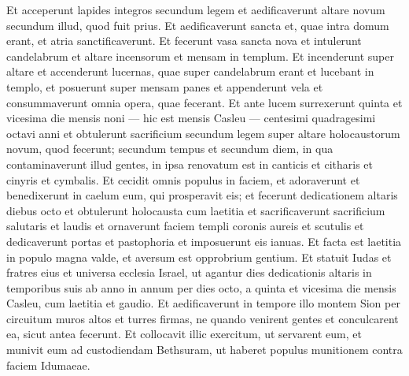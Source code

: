 \begin{biblechapter}
\verse Et acceperunt lapides integros secundum legem et aedificaverunt altare novum secundum illud, quod fuit prius. 
\verse Et aedificaverunt sancta et, quae intra domum erant, et atria sanctificaverunt.  
\verse Et fecerunt vasa sancta nova et intulerunt candelabrum et altare incensorum et mensam in templum. 
\verse Et incenderunt super altare et accenderunt lucernas, quae super candelabrum erant et lucebant in templo, 
\verse et posuerunt super mensam panes et appenderunt vela et consummaverunt omnia opera, quae fecerant. 
\verse Et ante lucem surrexerunt quinta et vicesima die mensis noni — hic est mensis Casleu — centesimi quadragesimi octavi anni 
\verse et obtulerunt sacrificium secundum legem super altare holocaustorum novum, quod fecerunt; 
\verse secundum tempus et secundum diem, in qua contaminaverunt illud gentes, in ipsa renovatum est in canticis et citharis et cinyris et cymbalis.  
\verse Et cecidit omnis populus in faciem, et adoraverunt et benedixerunt in caelum eum, qui prosperavit eis; 
\verse et fecerunt dedicationem altaris diebus octo et obtulerunt holocausta cum laetitia et sacrificaverunt sacrificium salutaris et laudis 
\verse et ornaverunt faciem templi coronis aureis et scutulis et dedicaverunt portas et pastophoria et imposuerunt eis ianuas. 
\verse Et facta est laetitia in populo magna valde, et aversum est opprobrium gentium. 
\verse Et statuit Iudas et fratres eius et universa ecclesia Israel, ut agantur dies dedicationis altaris in temporibus suis ab anno in annum per dies octo, a quinta et vicesima die mensis Casleu, cum laetitia et gaudio. 
\verse Et aedificaverunt in tempore illo montem Sion per circuitum muros altos et turres firmas, ne quando venirent gentes et conculcarent ea, sicut antea fecerunt. 
\verse Et collocavit illic exercitum, ut servarent eum, et munivit eum ad custodiendam Bethsuram, ut haberet populus munitionem contra faciem Idumaeae. 
\end{biblechapter}

